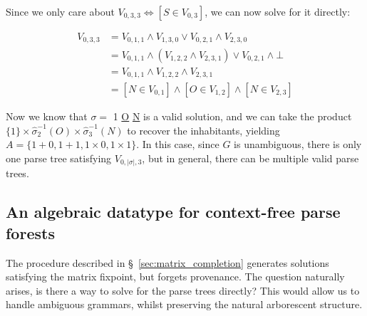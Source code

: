 \documentclass[runningheads]{llncs}
\begin{document}
  \noindent Since we only care about $V_{0, 3, 3} \Leftrightarrow [S \in V_{0, 3}]$, we can now solve for it directly:\vspace{-8pt}

  \begin{align*}
    V_{0, 3, 3} &= V_{0, 1, 1} \land V_{1, 3, 0} \lor V_{0, 2, 1} \land V_{2, 3, 0}\\
    &= V_{0, 1, 1} \land (V_{1, 2, 2} \land V_{2, 3, 1}) \lor V_{0, 2, 1} \land \bot\\
    &= V_{0, 1, 1} \land V_{1, 2, 2} \land V_{2, 3, 1}\\
    &= [N \in V_{0, 1}] \land [O \in V_{1, 2}] \land [N \in V_{2, 3}]
  \end{align*}

  Now we know that $\sigma =$ 1 \underline{O} \underline{N} is a valid solution, and we can take the product $\{1\}\times \hat\sigma_2^{-1}(O) \times \hat\sigma_3^{-1}(N)$ to recover the inhabitants, yielding $A=\{1+0, 1+1, 1\times 0, 1\times 1\}$. In this case, since $G$ is unambiguous, there is only one parse tree satisfying $V_{0, |\sigma|, 3}$, but in general, there can be multiple valid parse trees.

  \subsection{An algebraic datatype for context-free parse forests}\label{sec:ptree}

  The procedure described in \S~\ref{sec:matrix_completion} generates solutions satisfying the matrix fixpoint, but forgets provenance. The question naturally arises, is there a way to solve for the parse trees directly? This would allow us to handle ambiguous grammars, whilst preserving the natural arborescent structure.
\end{document}
